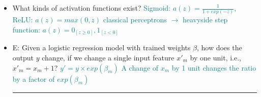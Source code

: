 \documentclass{report}
\newcommand{\asw}[2][teal]{}
\renewcommand{\asw}[2][teal]{\textcolor{#1}{#2}}
\begin{document}
\begin{itemize}
	\item What kinds of activation functions exist?
	\asw{\newline Sigmoid: $a(z) = \frac{1}{1+ exp(-z)}$, ReLU: $a(z) = max(0,z)$
		\newline classical perceptrons $\rightarrow$ heavyside step function: $a(z) = 0_{[z\geq0]}, 1_{[z<0]}$}
	\item E: Given a logistic regression model with trained weights $\beta$, how does the output $y$ change, if we change a single input feature $x'_m$ by one unit, i.e., $x'_m = x_m + 1$?
	\asw{\newline $y' = y \times exp(\beta_m)$
		\newline A change of $x_m$ by 1 unit changes the ratio by a factor of $exp(\beta_m)$}
	\newline
	\hrule 
	

\end{itemize}
\end{document}
